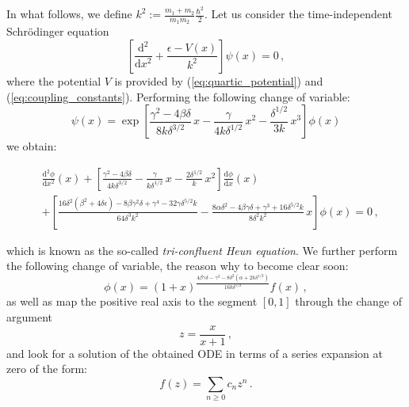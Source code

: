\documentclass[reprint, amsmath, amssymb, aps, prl]{revtex4-2}
\begin{document}
    In what follows, we define $k^2:=\frac{m_1+m_2}{m_1 m_2}\frac{\hbar^2}{2}$.
    Let us consider the time-independent Schr\"odinger equation
    \begin{equation}
        \left[\frac{\text{d}^2}{\text{d}x^2} + \frac{\epsilon - V(x)}{k^2}\right]\psi(x) = 0\,,
    \end{equation}
    where the potential $V$ is provided by (\ref{eq:quartic_potential}) and (\ref{eq:coupling_constants}).
    Performing the following change of variable:
    \begin{equation}
        \psi(x)=\exp\left[\frac{\gamma^2-4\beta\delta}{8k\delta^{3/2}}\,x-\frac{\gamma}{4k\delta^{1/2}}\,x^2-\frac{\delta^{1/2}}{3k}\,x^3\right]\phi(x)
    \end{equation}
    we obtain:
    \begin{widetext}
    \begin{equation}
    \begin{split}
        &\frac{\text{d}^2\phi}{\text{d}x^2}(x)+\left[\frac{\gamma^2-4\beta\delta}{4k\delta^{3/2}}-\frac{\gamma}{k\delta^{1/2}}\,x-\frac{2\delta^{1/2}}{k}\,x^2\right]\frac{\text{d}\phi}{\text{d}x}(x)\\
        &+\left[\frac{16 \delta ^2 \left(\beta ^2+4 \delta  \epsilon \right)-8 \beta  \gamma ^2 \delta +\gamma ^4-32 \gamma  \delta ^{5/2} k}{64 \delta ^3 k^2}-\frac{8 \alpha  \delta ^2-4 \beta  \gamma  \delta +\gamma ^3+16 \delta ^{5/2} k}{8 \delta ^2 k^2}\,x\right]\phi(x)=0\,,
    \end{split}
    \end{equation}
    \end{widetext}
    which is known as the so-called \textit{tri-confluent Heun equation}.
    We further perform the following change of variable, the reason why to become clear soon:
    \begin{equation}
        \phi(x)=(1+x)^{\frac{4 \beta  \gamma  \delta -\gamma ^3-8 \delta ^2 \left(\alpha +2k \delta^{1/2} \right)}{16k \delta ^{5/2}}}f(x)\,,
    \end{equation}
    as well as map the positive real axis to the segment $[0,1]$ through the change of argument
    \begin{equation}
        z=\frac{x}{x+1}\,,
    \end{equation}
    and look for a solution of the obtained ODE in terms of a series expansion at zero of the form:
    \begin{equation}
        f(z)=\sum_{n\geq 0}c_nz^n\,.
    \end{equation}
\end{document}
